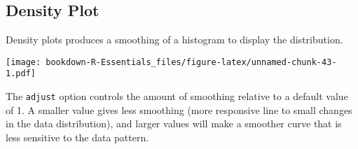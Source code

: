 \documentclass[]{book}
\newenvironment{Shaded}{\begin{snugshade}}{\end{snugshade}}
\newcommand{\KeywordTok}[1]{\textcolor[rgb]{0.13,0.29,0.53}{\textbf{#1}}}
\newcommand{\DataTypeTok}[1]{\textcolor[rgb]{0.13,0.29,0.53}{#1}}
\newcommand{\DecValTok}[1]{\textcolor[rgb]{0.00,0.00,0.81}{#1}}
\newcommand{\FloatTok}[1]{\textcolor[rgb]{0.00,0.00,0.81}{#1}}
\newcommand{\StringTok}[1]{\textcolor[rgb]{0.31,0.60,0.02}{#1}}
\newcommand{\CommentTok}[1]{\textcolor[rgb]{0.56,0.35,0.01}{\textit{#1}}}
\newcommand{\OperatorTok}[1]{\textcolor[rgb]{0.81,0.36,0.00}{\textbf{#1}}}
\newcommand{\NormalTok}[1]{#1}
\begin{document}
\subsection{Density Plot}\label{density-plot}

Density plots produces a smoothing of a histogram to display the
distribution.

\begin{Shaded}
\end{Shaded}

\texttt{[image: bookdown-R-Essentials\_files/figure-latex/unnamed-chunk-43-1.pdf]}

The \texttt{adjust} option controls the amount of smoothing relative to
a default value of 1. A smaller value gives less smoothing (more
responsive line to small changes in the data distribution), and larger
values will make a smoother curve that is less sensitive to the data
pattern.

\begin{Shaded}
\end{Shaded}
\end{document}
